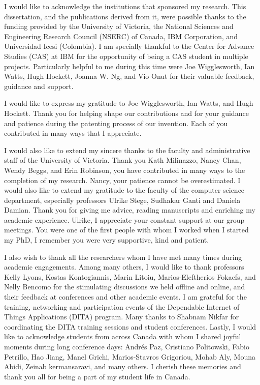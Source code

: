{I would like to acknowledge the institutions that sponsored my research. This dissertation, and the publications derived from it, were possible thanks to the funding provided by the University of Victoria, the National Sciences and Engineering Research Council (NSERC) of Canada, IBM Corporation, and Universidad Icesi (Colombia). I am specially thankful to the Center for Advance Studies (CAS) at IBM for the opportunity of being a CAS student in multiple projects. Particularly helpful to me during this time were Joe Wigglesworth, Ian Watts, Hugh Hockett, Joanna W. Ng, and Vio Onut for their valuable feedback, guidance and support.

I would like to express my gratitude to Joe Wigglesworth, Ian Watts, and Hugh Hockett. Thank you for helping shape our contributions and for your guidance and patience during the patenting process of our invention. Each of you contributed in many ways that I appreciate.

I would also like to extend my sincere thanks to the faculty and administrative staff of the University of Victoria. Thank you Kath Milinazzo, Nancy Chan, Wendy Beggs, and Erin Robinson, you have contributed in many ways to the completion of my research. Nancy, your patience cannot be overestimated. I would also like to extend my gratitude to the faculty of the computer science department, especially professors Ulrike Stege, Sudhakar Ganti and Daniela Damian. Thank you for giving me advice, reading manuscripts and enriching my academic experience. Ulrike, I appreciate your constant support at our group meetings. You were one of the first people with whom I worked when I started my PhD, I remember you were very supportive, kind and patient.

I also wish to thank all the researchers whom I have met many times during academic engagements. Among many others, I would like to thank professors Kelly Lyons, Kostas Kontogiannis, Marin Litoiu, Marios-Eleftherios Fokaefs, and Nelly Bencomo for the stimulating discussions we held offline and online, and their feedback at conferences and other academic events. I am grateful for the training, networking and participation events of the Dependable Internet of Things Applications (DITA) program. Many thanks to Shabnam Nikfar for coordinating the DITA training sessions and student conferences. Lastly, I would like to acknowledge students from across Canada with whom I shared joyful moments during long conference days: Andr\'{e}s Paz, Cristiano Politowski, Fabio Petrillo, Hao Jiang, Manel Grichi, Marios-Stavros Grigoriou, Mohab Aly, Mouna Abidi, Zeinab kermansaravi, and many others. I cherish these memories and thank you all for being a part of my student life in Canada.

}
